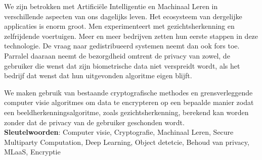 We zijn betrokken met Artifici\"ele Intelligentie en Machinaal Leren in verschillende aspecten van ons dagelijks leven. Het ecosysteem van dergelijke applicaties is enorm groot. Men experimenteert met gezichtsherkenning en zelfrijdende voertuigen. Meer en meer bedrijven zetten hun eerste stappen in deze technologie. De vraag naar gedistribueerd systemen neemt dan ook fors toe. Parralel daaraan neemt de bezorgdheid omtrent de privacy van zowel, de gebruiker die wenst dat zijn biometrische data niet verspreidt wordt, als het bedrijf dat wenst dat hun uitgevonden algoritme eigen blijft.

We maken gebruik van bestaande cryptografische methodes en grensverleggende computer visie algoritmes om data te encrypteren op een bepaalde manier zodat een beeldherkenningsalgoritme, zoals gezichtsherkenning, berekend kan worden zonder dat de privacy van de gebruiker geschonden wordt.\\

\textbf{Sleutelwoorden}: Computer visie, Cryptografie, Machinaal Leren, Secure Multiparty Computation, Deep Learning, Object detetcie, Behoud van privacy, MLaaS, Encryptie
